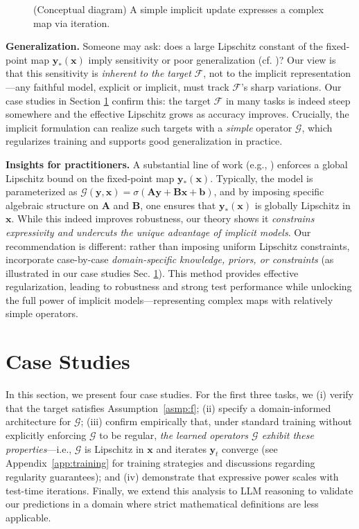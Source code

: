 \documentclass{amsart} %
\def\vb{{\bm{b}}}
\def\vx{{\bm{x}}}
\def\vy{{\bm{y}}}
\def\mA{{\bm{A}}}
\def\mB{{\bm{B}}}
\def\cF{{\mathcal{F}}}
\def\cG{{\mathcal{G}}}
\theoremstyle{definition}
\theoremstyle{remark}
\begin{document}
\begin{figure}[t] %
    \centering
    \resizebox{\linewidth}{!}{}
    \caption{(Conceptual diagram) A simple implicit update expresses a complex map via iteration.}
    \label{fig:toy-diagram}
\end{figure}


\textbf{Generalization.} Someone may ask: {does a large Lipschitz constant of the fixed-point map $\vy_\ast(\vx)$ imply sensitivity or poor generalization} (cf. \cite{pabbaraju2021estimating})? Our view is that this sensitivity is \emph{inherent to the target} $\cF$, not to the implicit representation—any faithful model, explicit or implicit, must track $\cF$’s sharp variations. Our case studies in Section \ref{sec:cases} confirm this: the target $\cF$ in many tasks is indeed steep somewhere and the effective Lipschitz grows as accuracy improves. Crucially, the implicit formulation can realize such targets with a \textit{simple} operator $\cG$, which regularizes training and supports good generalization in practice. 



\textbf{Insights for practitioners.} A substantial line of work (e.g., \cite{el2021implicit,winston2020monotone,jafarpour2021robust,revay2020lipschitz,havens2023exploiting}) enforces a global Lipschitz bound on the fixed-point map $\vy_\ast(\vx)$. Typically, the model is parameterized as $\cG(\vy,\vx)=\sigma(\mA\vy+\mB\vx+\vb)$, and by imposing specific algebraic structure on $\mA$ and $\mB$,
one ensures that $\vy_\ast(\vx)$ is globally Lipschitz in $\vx$. While this indeed improves robustness, our theory shows it \textit{constrains expressivity and undercuts the unique advantage of implicit models}. Our recommendation is different: rather than imposing uniform Lipschitz constraints, incorporate case-by-case \textit{domain-specific knowledge, priors, or constraints} (as illustrated in our case studies Sec. \ref{sec:cases}). This method provides effective regularization, leading to robustness and strong test performance while unlocking the full power of implicit models—representing complex maps with relatively simple operators.

\section{Case Studies}
\label{sec:cases}


In this section, we present four case studies. For the first three tasks, we (i) verify that the target satisfies Assumption~\ref{asmp:f}; (ii) specify a domain-informed architecture for $\cG$; (iii) confirm empirically that, under standard training without explicitly enforcing $\cG$ to be regular, \textit{the learned operators $\cG$ exhibit these properties}---i.e., $\cG$ is Lipschitz in $\vx$ and iterates $\vy_t$ converge (see Appendix~\ref{app:training} for training strategies and discussions regarding regularity guarantees); and (iv) demonstrate that expressive power scales with test-time iterations. Finally, we extend this analysis to LLM reasoning to validate our predictions in a domain where strict mathematical definitions are less applicable.
\end{document}
